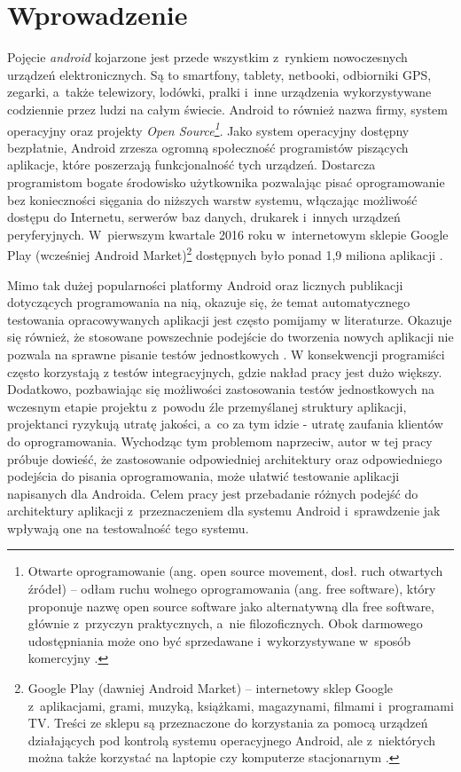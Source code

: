 \chapter{Wprowadzenie}
\label{wstep}

Pojęcie \textit{android} kojarzone jest przede wszystkim z~rynkiem nowoczesnych urządzeń elektronicznych. Są to smartfony, tablety, netbooki, odbiorniki GPS, zegarki, a~także telewizory, lodówki, pralki i~inne urządzenia wykorzystywane codziennie przez ludzi na całym świecie. Android to również nazwa firmy, system operacyjny oraz projekty \textit{Open Source\footnote{Otwarte oprogramowanie (ang. open source movement, dosł. ruch otwartych źródeł) – odłam ruchu wolnego oprogramowania (ang. free software), który proponuje nazwę open source software jako alternatywną dla free software, głównie z~przyczyn praktycznych, a~nie filozoficznych. Obok darmowego udostępniania może ono być sprzedawane i~wykorzystywane w~sposób komercyjny \cite{website:wikipedia}.}}. Jako system operacyjny dostępny bezpłatnie, Android zrzesza ogromną społeczność programistów piszących aplikacje, które poszerzają funkcjonalność tych urządzeń. Dostarcza programistom bogate środowisko użytkownika pozwalając pisać oprogramowanie bez konieczności sięgania do niższych warstw systemu, włączając możliwość dostępu do Internetu, serwerów baz danych, drukarek i~innych urządzeń peryferyjnych. W~pierwszym kwartale 2016 roku w~internetowym sklepie Google Play (wcześniej Android Market)\footnote{Google Play (dawniej Android Market) – internetowy sklep Google z~aplikacjami, grami, muzyką, książkami, magazynami, filmami i~programami TV. Treści ze sklepu są przeznaczone do korzystania za pomocą urządzeń działających pod kontrolą systemu operacyjnego Android, ale z~niektórych można także korzystać na laptopie czy komputerze stacjonarnym \cite{website:wikipedia}.} dostępnych było ponad 1,9 miliona aplikacji \cite{website:wikipedia}. 

Mimo tak dużej popularności platformy Android oraz licznych publikacji dotyczących programowania na nią, okazuje się, że temat automatycznego testowania opracowywanych aplikacji jest często pomijamy w literaturze. Okazuje się również, że stosowane powszechnie podejście do tworzenia nowych aplikacji nie pozwala na sprawne pisanie testów jednostkowych \cite{tematpracy}. W konsekwencji programiści często korzystają z testów integracyjnych, gdzie nakład pracy jest dużo większy. Dodatkowo, pozbawiając się możliwości zastosowania testów jednostkowych na wczesnym etapie projektu z~powodu źle przemyślanej struktury aplikacji, projektanci ryzykują utratę jakości, a~co za tym idzie - utratę zaufania klientów do oprogramowania. Wychodząc tym problemom naprzeciw, autor w tej pracy próbuje dowieść, że zastosowanie odpowiedniej architektury oraz odpowiedniego podejścia do pisania oprogramowania, może ułatwić testowanie aplikacji napisanych dla Androida. Celem pracy jest przebadanie różnych podejść do architektury aplikacji z~przeznaczeniem dla systemu Android i~sprawdzenie jak wpływają one na testowalność tego systemu. 

